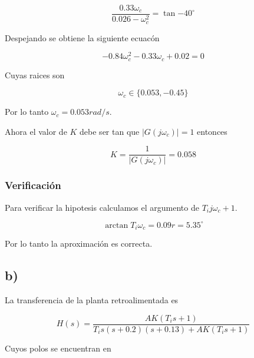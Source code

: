 \documentclass{article}
\begin{document}
        \begin{equation}
            \frac{0.33\omega_c}{ 0.026 - \omega_c^2 } = \tan{-40^\circ}
        \end{equation}

        Despejando se obtiene la siguiente ecuacón 

        \begin{equation}
            -0.84\omega_c^2 - 0.33\omega_c + 0.02 = 0
        \end{equation}

        Cuyas raices son 

        \begin{equation}
            \omega_c \in \{ 0.053 , -0.45  \}
        \end{equation}

        Por lo tanto $\omega_c = 0.053rad/s$.

        Ahora el valor de $K$ debe ser tan que $|G(j\omega_c)|=1$ entonces 

        \begin{equation}
            K = \frac{1}{|G(j\omega_c)|} = 0.058        
        \end{equation}

        \subsubsection{Verificación}

        Para verificar la hipotesis calculamos el argumento de $T_ij\omega_c+1$.

        \begin{equation}
            \arctan{ T_i\omega_c } = 0.09r = 5.35^\circ
        \end{equation}

        Por lo tanto la aproximación es correcta.

        \subsection{b)}

            La transferencia de la planta retroalimentada es 

            \begin{equation}
                H(s) = \frac{AK( T_i s + 1 )}{ T_is( s + 0.2 )(s + 0.13) + AK(T_i s + 1) }
            \end{equation}

            Cuyos polos se encuentran en 
\end{document}

